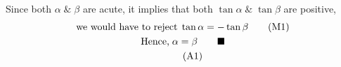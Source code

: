     \newpage
    Since both \(\alpha \;\&\; \beta\) are acute, it implies that both \(\tan{\alpha} \;\&\; \tan{\beta}\) are positive,
    \begin{gather*}
        \text{we would have to reject} \; \tan{\alpha} = -\tan{\beta} \wrkonemark \\
        \text{Hence,} \; \alpha = \beta \tag*{\qedsymbol} \\ \ansonemark
    \end{gather*}


